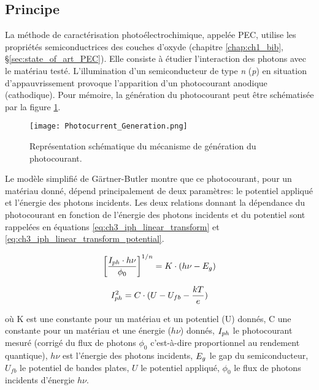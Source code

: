 \begin{refsection}
    \subsection{Principe}\label{subsec:ch3_principal_PEC}

    La méthode de caractérisation photoélectrochimique, appelée PEC, utilise les propriétés semiconductrices
    des couches d'oxyde (chapitre \ref{chap:ch1_bib}, \S\ref{sec:state_of_art_PEC}). Elle consiste
    à étudier l'interaction des photons avec le matériau testé. L'illumination d'un semiconducteur de type \emph{n}
    (\emph{p}) en situation d'appauvrissement provoque l'apparition d'un photocourant anodique (cathodique). Pour
    mémoire, la génération du photocourant peut être schématisée par la figure \ref{fig:ch3_photocurrent_generation}.
    

    \begin{figure}[H]
        \centering
        \texttt{[image: Photocurrent\_Generation.png]}
        \caption{Représentation schématique du mécanisme de génération du photocourant.}
       \label{fig:ch3_photocurrent_generation}
    \end{figure}


    Le modèle simplifié de Gärtner-Butler montre que ce photocourant, pour un matériau donné, dépend principalement de deux paramètres: le
    potentiel appliqué et l'énergie des photons incidents. Les deux relations donnant la dépendance du photocourant en
    fonction de l'énergie des photons incidents et du potentiel sont rappelées en équations
    \ref{eq:ch3_iph_linear_transform} et \ref{eq:ch3_iph_linear_transform_potential}.

 
    \begin{equation}
        \left[ \frac{I_{ph} \cdot h\nu}{\phi _0} \right] ^{1/n} = K \cdot (h\nu - E_g)
        \label{eq:ch3_iph_linear_transform}
    \end{equation}

     \begin{equation}
        I_{ph}^2 = C \cdot (U-U_{fb}-\frac{kT}{e})
        \label{eq:ch3_iph_linear_transform_potential}
    \end{equation}

    \noindent où K est une constante pour un matériau et un potentiel (U) donnés, C une constante pour un
    matériau et une énergie ($h\nu$) donnés, 
    $I_{ph}$ le photocourant mesuré (corrigé du flux de photons $\phi_0$ c'est-à-dire proportionnel au rendement quantique),
    $h\nu$ est l'énergie des photons incidents, $E _g$ le gap du
    semiconducteur, $U_{fb}$ le potentiel de bandes plates, $U$ le potentiel appliqué, $\phi _0$ le flux de
    photons incidents d'énergie $h\nu$.


\end{refsection}
